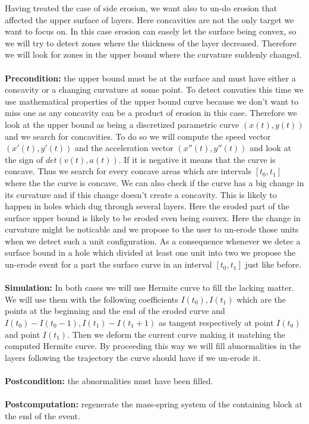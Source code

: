 \documentclass[12pt, a4paper]{memoir} %
\begin{document}
Having treated the case of side erosion, we want also to un-do erosion that affected the upper surface of layers. Here concavities are not the only target we want to focus on. In this case erosion can easely let the surface being convex, so we will try to detect zones where the thickness of the layer decreased. Therefore we will look for zones in the upper bound where the curvature suddenly changed.\\\\
\textbf{Precondition:} the upper bound must be at the surface and must have either a concavity or a changing curvature at some point. To detect convaties this time we use mathematical properties of the upper bound curve because we don't want to miss one as any concavity can be a product of erosion in this case. Therefore we look at the upper bound as being a discretized parametric curve $(x(t),y(t))$ and we search for concavities. To do so we will compute the speed vector $(x'(t),y'(t))$ and the acceleration vector $(x''(t),y''(t))$ and look at the sign of $det(v(t),a(t))$. If it is negative it means that the curve is concave. Thus we search for every concave areas which are intervals $[t_0,t_1]$ where the the curve is concave. We can also check if the curve has a big change in its curvature and if this change doesn't create a concavity. This is likely to happen  in holes which dug through several layers. Here the eroded part of the surface upper bound is likely to be eroded even being convex. Here the change in curvature might be noticable and we propose to the user to un-erode those units when we detect such a unit configuration. As a consequence whenever we detec a surface bound in a hole which divided at least one unit into two we propose the un-erode event for a part the surface curve in an interval $[t_0,t_1]$ just like before.\\\\
\textbf{Simulation:} In both cases we will use Hermite curve to fill the lacking matter. We will use them with the following coefficients $I(t_0), I(t_1)$ which are the points at the beginning and the end of the eroded curve and $I(t_0) - I(t_0 - 1), I(t_1) - I(t_1 + 1)$  as tangent respectively at point $I(t_0)$ and point $I(t_1)$. Then we deform the current curve making it matching the computed Hermite curve. By proceeding this way we will fill abnormalities in the layers following the trajectory the curve should have if we un-erode it.\\\\
\textbf{Postcondition:} the abnormalities must have been filled.\\\\
\textbf{Postcomputation:} regenerate the mass-spring system of the containing block at the end of the event.\\\\
\end{document}
